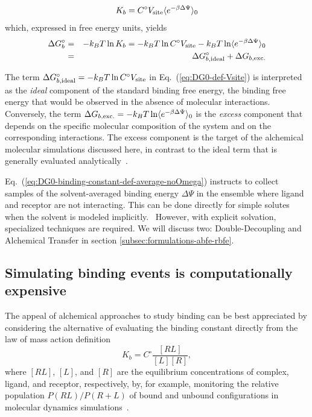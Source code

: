 \documentclass[9pt,bestpractices]{livecoms}
\begin{document}
\begin{equation}\label{eq:DG0-binding-constant-def-average-noOmega}
K_b = C^\circ V_{\rm site} \langle e^{-\beta \Delta \Psi}  \rangle_0 
\end{equation}
which, expressed in free energy units, yields
\begin{eqnarray}\label{eq:DG0-def-Vsite}
  \Delta G^\circ_b &=&  - k_B T \ln K_b = - k_B T \ln C^\circ V_{\rm site} - k_B T \ln \langle e^{-\beta \Delta \Psi}  \rangle_0 \nonumber \\
{\rm \ }  &=& \Delta G^\circ_{b,{\rm ideal}} + \Delta G_{b,{\rm exc.}}
\end{eqnarray}

The term $\Delta G^\circ_{b,{\rm ideal}} = - k_B T \ln C^\circ V_{\rm site}$ in Eq.~(\ref{eq:DG0-def-Vsite}) is interpreted as the \emph{ideal} component of the standard binding free energy, the binding free energy that would be observed in the absence of molecular interactions. Conversely, the term $\Delta G_{b,{\rm exc.}} = - k_B T \ln \langle e^{-\beta \Delta \Psi}  \rangle_0 $ is the \emph{excess} component that depends on the specific molecular composition of the system and on the corresponding interactions. The excess component is the target of the alchemical molecular simulations discussed here, in contrast to the ideal term that is generally evaluated analytically~\cite{boresch2003absolute}.

Eq.~(\ref{eq:DG0-binding-constant-def-average-noOmega}) instructs to collect samples of the solvent-averaged binding energy $\Delta \Psi$ in the ensemble where ligand and receptor are not interacting. This can be done directly for simple solutes when the solvent is modeled implicitly.~\cite{gallicchio2014virtual} However, with explicit solvation, specialized techniques are required. We will discuss two: Double-Decoupling and Alchemical Transfer in section \ref{subsec:formulations-abfe-rbfe}.


\subsection{Simulating binding events is computationally expensive}

The appeal of alchemical approaches to study binding can be best appreciated by considering the alternative of evaluating the binding constant directly from the law of mass action definition
\begin{equation}\label{eq:law-mass-action}
 K_b = C^{\circ}\frac{[RL]}{[L][R]},
\end{equation}
where $[RL]$, $[L]$, and $[R]$ are the equilibrium concentrations of complex, ligand, and receptor, respectively, by, for example, monitoring the relative population $P(RL)/P(R+L)$ of bound and unbound configurations in molecular dynamics simulations~\cite{jong2011determining,pan2017quantitative}.
\end{document}
